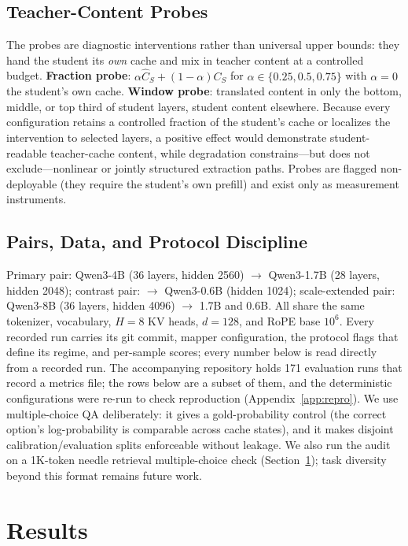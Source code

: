 \documentclass{article} %
\begin{document}
\subsection{Teacher-Content Probes}
The probes are diagnostic interventions rather than universal upper bounds:
they hand the student its \emph{own} cache and mix in teacher content at a
controlled budget.
\textbf{Fraction probe}: $\alpha\widehat{C}_S + (1-\alpha)C_S$ for
$\alpha \in \{0.25, 0.5, 0.75\}$ with $\alpha{=}0$ the student's own cache.
\textbf{Window probe}: translated content in only the bottom, middle, or top
third of student layers, student content elsewhere. Because every
configuration retains a controlled fraction of the student's cache or
localizes the intervention to selected layers, a positive
effect would demonstrate student-readable teacher-cache content, while
degradation constrains---but does not exclude---nonlinear or jointly
structured extraction paths. Probes are
flagged non-deployable (they require the student's own prefill) and exist
only as measurement instruments.

\subsection{Pairs, Data, and Protocol Discipline}
Primary pair: Qwen3-4B (36 layers, hidden 2560) $\to$ Qwen3-1.7B (28 layers,
hidden 2048); contrast pair: $\to$ Qwen3-0.6B (hidden 1024); scale-extended
pair: Qwen3-8B (36 layers, hidden 4096) $\to$ 1.7B and 0.6B. All share the
same tokenizer, vocabulary, $H{=}8$ KV heads, $d{=}128$, and RoPE base
$10^6$. Every recorded run carries its git commit, mapper configuration, the
protocol flags that define its regime, and per-sample scores; every number
below is read directly from a recorded run. The accompanying repository holds
171 evaluation runs that record a metrics file; the rows below are a subset of
them, and the deterministic configurations were re-run to check reproduction
(Appendix~\ref{app:repro}).
We use multiple-choice QA deliberately: it gives a gold-probability control
(the correct option's log-probability is comparable across cache states),
and it makes disjoint calibration/evaluation splits enforceable without
leakage. We also run the audit on a 1K-token needle retrieval
multiple-choice check (Section~\ref{sec:results}); task diversity beyond this
format remains future work.

\section{Results}
\label{sec:results}
\end{document}
